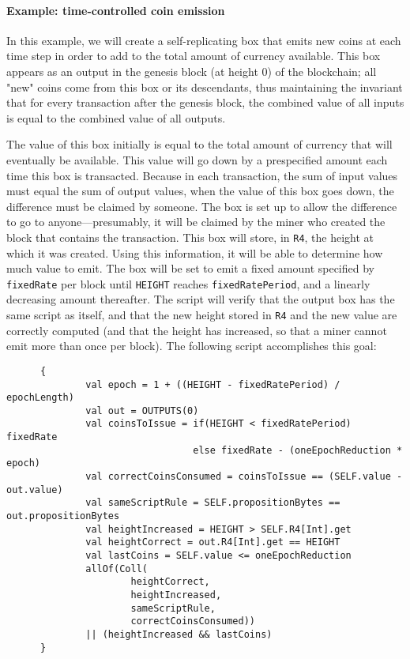 \documentclass[11pt]{article}
\begin{document}
\paragraph{Example: time-controlled coin emission}
In this example, we will create a self-replicating box that emits new coins at each time step in order to add to the total amount of currency available. This box appears as an output in the genesis block (at height 0) of the blockchain; all "new" coins come from this box or its descendants, thus maintaining the invariant that for every transaction after the genesis block, the combined value of all inputs  is equal to the combined value of all outputs.

The value of this box initially is equal to the total amount of currency that will eventually be available. This value will go down by a prespecified amount each time this box is transacted. Because in each transaction, the sum of input values must equal the sum of output values, when the value of this box goes down, the difference must be claimed by someone. The box is set up to allow the difference to go to anyone---presumably, it will be claimed by the miner who created the block that contains the transaction. This box will store, in \texttt{R4}, the height at which it was created. Using this information, it will be able to determine how much value to emit. The box will be set to emit
a fixed amount specified by \texttt{fixedRate} per block until \texttt{HEIGHT} reaches \texttt{fixedRatePeriod}, and a linearly decreasing amount thereafter. The script will verify that the output box has the same script as itself, and that the new height stored in \texttt{R4} and the new value are correctly computed (and that the height has increased, so that a miner cannot emit more than once per block). The following script accomplishes this goal:
\begin{verbatim}
      {
              val epoch = 1 + ((HEIGHT - fixedRatePeriod) / epochLength)
              val out = OUTPUTS(0)
              val coinsToIssue = if(HEIGHT < fixedRatePeriod) fixedRate
                                 else fixedRate - (oneEpochReduction * epoch)
              val correctCoinsConsumed = coinsToIssue == (SELF.value - out.value)
              val sameScriptRule = SELF.propositionBytes == out.propositionBytes
              val heightIncreased = HEIGHT > SELF.R4[Int].get
              val heightCorrect = out.R4[Int].get == HEIGHT
              val lastCoins = SELF.value <= oneEpochReduction
              allOf(Coll(
                      heightCorrect,
                      heightIncreased,
                      sameScriptRule,
                      correctCoinsConsumed))
              || (heightIncreased && lastCoins)
      }
\end{verbatim}
\end{document}

